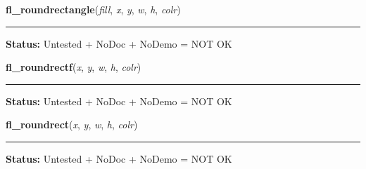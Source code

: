     \label{xformslib:library:fl_roundrectangle}

    \vspace{0.5ex}

\hspace{.8\funcindent}\begin{boxedminipage}{\funcwidth}

    \raggedright \textbf{fl\_roundrectangle}(\textit{fill}, \textit{x}, \textit{y}, \textit{w}, \textit{h}, \textit{colr})

    \vspace{-1.5ex}

    \rule{\textwidth}{0.5\fboxrule}
\setlength{\parskip}{2ex}
\setlength{\parskip}{1ex}
\textbf{Status:} Untested + NoDoc + NoDemo = NOT OK



    \end{boxedminipage}

    \label{xformslib:library:fl_roundrectf}

    \vspace{0.5ex}

\hspace{.8\funcindent}\begin{boxedminipage}{\funcwidth}

    \raggedright \textbf{fl\_roundrectf}(\textit{x}, \textit{y}, \textit{w}, \textit{h}, \textit{colr})

    \vspace{-1.5ex}

    \rule{\textwidth}{0.5\fboxrule}
\setlength{\parskip}{2ex}
\setlength{\parskip}{1ex}
\textbf{Status:} Untested + NoDoc + NoDemo = NOT OK



    \end{boxedminipage}

    \label{xformslib:library:fl_roundrect}

    \vspace{0.5ex}

\hspace{.8\funcindent}\begin{boxedminipage}{\funcwidth}

    \raggedright \textbf{fl\_roundrect}(\textit{x}, \textit{y}, \textit{w}, \textit{h}, \textit{colr})

    \vspace{-1.5ex}

    \rule{\textwidth}{0.5\fboxrule}
\setlength{\parskip}{2ex}
\setlength{\parskip}{1ex}
\textbf{Status:} Untested + NoDoc + NoDemo = NOT OK



    \end{boxedminipage}

